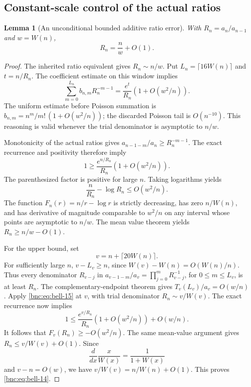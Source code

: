 \documentclass[11pt]{article}
\numberwithin{equation}{section}
\newtheorem{lemma}[theorem]{Lemma}
\theoremstyle{definition}
\theoremstyle{remark}
\begin{document}
\subsection{Constant-scale control of the actual ratios}

\begin{lemma}[An unconditional bounded additive ratio error]\label{bnc:lem:actualratio}
With \(R_n=a_n/a_{n-1}\) and \(w=W(n)\),
\begin{equation}\label{bnc:eq:bell-14}
R_n=\frac n w+O(1).
\end{equation}
\end{lemma}

\begin{proof}
The inherited ratio equivalent gives \(R_n\sim n/w\).
Put \(L_n=\lceil16W(n)\rceil\) and \(t=n/R_n\).
The coefficient estimate on this window implies
\begin{equation}\label{bnc:eq:bell-15}
\sum_{m=0}^{L_n} b_{n,m}R_n^{-m-1}
  =\frac{e^t}{R_n}\left(1+O(w^2/n)\right).
\end{equation}
The uniform estimate before Poisson summation is
\(b_{n,m}=n^m/m!\,(1+O(w^2/n))\);
the discarded Poisson tail is \(O(n^{-10})\).
This reasoning is valid whenever the trial denominator is
asymptotic to \(n/w\).

Monotonicity of the actual ratios gives
\(a_{n-1-m}/a_n\ge R_n^{-m-1}\).
The exact recurrence and positivity therefore imply
\[
 1\ge \frac{e^{n/R_n}}{R_n}(1+O(w^2/n)).
\]
The parenthesized factor is positive for large \(n\).
Taking logarithms yields
\[
 \frac n{R_n}-\log R_n\le O(w^2/n).
\]
The function \(F_n(r)=n/r-\log r\) is strictly decreasing, has
zero \(n/W(n)\), and has derivative of magnitude comparable to
\(w^2/n\) on any interval whose points are asymptotic to \(n/w\).
The mean value theorem yields \(R_n\ge n/w-O(1)\).

For the upper bound, set
\[
 v=n+\lceil20W(n)\rceil.
\]
For sufficiently large \(n\), \(v-L_v\ge n\), since
\(W(v)-W(n)=O(W(n)/n)\).
Thus every denominator \(R_{v-j}\) in
\(a_{v-1-m}/a_v=\prod_{j=0}^{m}R_{v-j}^{-1}\),
for \(0\le m\le L_v\), is at least \(R_n\).
The complementary-endpoint theorem gives \(T_v(L_v)/a_v=O(w/n)\).
Apply \eqref{bnc:eq:bell-15} at \(v\), with trial denominator \(R_n\sim v/W(v)\).
The exact recurrence now implies
\[
 1\le \frac{e^{v/R_n}}{R_n}
           (1+O(w^2/n))+O(w/n).
\]
It follows that \(F_v(R_n)\ge-O(w^2/n)\).
The same mean-value argument gives
\(R_n\le v/W(v)+O(1)\).
Since
\[
 \frac{d}{dx}\frac{x}{W(x)}=\frac1{1+W(x)}
\]
and \(v-n=O(w)\), we have \(v/W(v)=n/W(n)+O(1)\).
This proves \eqref{bnc:eq:bell-14}.
\end{proof}
\end{document}
